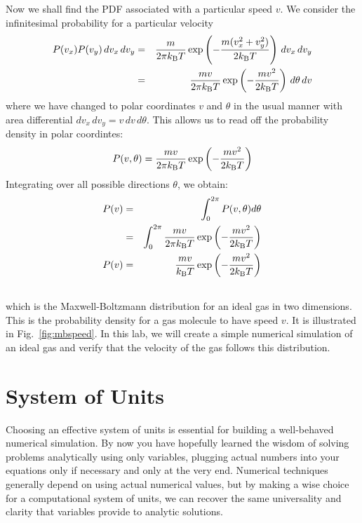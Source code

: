 {Now we shall find the PDF associated with a particular speed $v$.  We consider the infinitesimal probability for a particular velocity
\begin{eqnarray*}
P(v_x) P(v_y) \, dv_x \, dv_y
  &=& \frac{m}{2 \pi k_{\rm B} T} \exp\left(-\frac{m (v_x^2+v_y^2)}{2k_{\rm B} T}\right) \, dv_x \, dv_y \\
  &=& \frac{m v}{2 \pi k_{\rm B} T} \exp\left(-\frac{m v^2}{2k_{\rm B} T}\right) \, d\theta \, dv \\
\end{eqnarray*}
where we have changed to polar coordinates $v$ and $\theta$ in the usual manner with area differential $dv_x \, dv_y = v \, dv \, d\theta$.  This allows us to read off the probability density in polar coordintes:
\begin{equation*}
P(v, \theta) = \frac{m v}{2 \pi k_{\rm B} T} \exp\left(-\frac{m v^2}{2k_{\rm B} T}\right) 
\end{equation*}
Integrating over all possible directions $\theta$, we obtain:
\begin{eqnarray}
P(v) &=& \int_0^{2\pi} P(v,\theta) d\theta \nonumber \\
     &=& \int_0^{2\pi} \frac{m v}{2 \pi k_{\rm B} T} \exp\left(-\frac{m v^2}{2k_{\rm B} T}\right) \nonumber \\
P(v) &=& \frac{m v}{k_{\rm B} T} \exp \left(-\frac{m v^2}{2k_{\rm B} T}\right) \label{eqn:mbv}\\
\nonumber
\end{eqnarray}
which is the Maxwell-Boltzmann distribution for an ideal gas in two
dimensions.  This is the probability density for a gas molecule to
have speed $v$. It is illustrated in Fig.~\ref{fig:mbspeed}.  In this
lab, we will create a simple numerical simulation of an ideal gas and
verify that the velocity of the gas follows this distribution.

\section{System of Units}

Choosing an effective system of units is essential for building a
well-behaved numerical simulation.  By now you have hopefully learned
the wisdom of solving problems analytically using only variables,
plugging actual numbers into your equations only if necessary and only
at the very end.  Numerical techniques generally depend on using
actual numerical values, but by making a wise choice for a
computational system of units, we can recover the same universality
and clarity that variables provide to analytic solutions.

}
